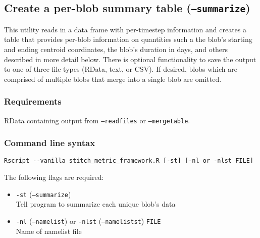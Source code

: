 \documentclass{article}
\begin{document}
\subsection{Create a per-blob summary table (\texttt{--summarize})}\label{summarysection}
This utility reads in a data frame with per-timestep information and creates a table that provides per-blob information on quantities such a the blob's starting and ending centroid coordinates, the blob's duration in days, and others described in more detail below.  There is optional functionality to save the output to one of three file types (RData, text, or CSV). If desired, blobs which are comprised of multiple blobs that merge into a single blob are omitted.

\subsubsection{Requirements}

RData containing output from \texttt{--readfiles} or \texttt{--mergetable}.

\subsubsection{Command line syntax}

\begin{verbatim}
Rscript --vanilla stitch_metric_framework.R [-st] [-nl or -nlst FILE]
\end{verbatim}

The following flags are required:
\begin{itemize}
\item[] \texttt{-st} (\texttt{--summarize})\\ Tell program to summarize each unique blob's data
\item[]\texttt{-nl} (\texttt{--namelist}) or \texttt{-nlst} (\texttt{--namelistst}) \texttt{FILE}\\ Name of namelist file
\end{itemize}
\end{document}
